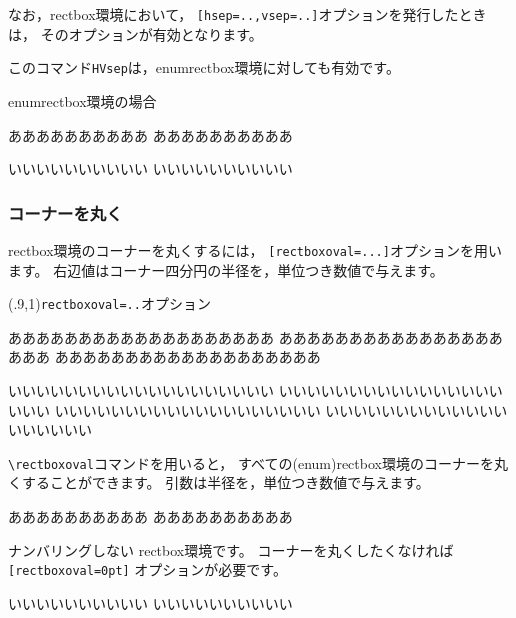 なお，\textsf{rectbox}環境において，
\verb+[hsep=..,vsep=..]+オプションを発行したときは，
そのオプションが有効となります。

このコマンド\verb+HVsep+は，\textsf{enumrectbox}環境に対しても有効です。

\begin{showEx}{\textsf{enumrectbox}環境の場合}
\begin{enumrectbox}
ああああああああああ
ああああああああああ
\end{enumrectbox}

\begin{enumrectbox}
いいいいいいいいいい
いいいいいいいいいい
\end{enumrectbox}
\end{showEx}
\newpage

\subsubsection{コーナーを丸く}
\textsf{rectbox}環境のコーナーを丸くするには，
\verb+[rectboxoval=...]+オプションを用います。
右辺値はコーナー四分円の半径を，単位つき数値で与えます。

\begin{showEx}(.9,1){\texttt{rectboxoval=..}オプション}
\begin{rectbox}[rectboxoval=10pt]
あああああああああああああああああああ
あああああああああああああああああああ
あああああああああああああああああああ

いいいいいいいいいいいいいいいいいいい
いいいいいいいいいいいいいいいいいいい
いいいいいいいいいいいいいいいいいいい
いいいいいいいいいいいいいいいいいいい
\end{rectbox}
\end{showEx}

\verb+\rectboxoval+コマンドを用いると，
すべての\textsf{(enum)rectbox}環境のコーナーを丸くすることができます。
引数は半径を，単位つき数値で与えます。

\begin{showEx}{}
\rectboxoval{6pt}
\begin{enumrectbox}
ああああああああああ
ああああああああああ
\end{enumrectbox}

\begin{rectbox}[rectboxoval=0pt]
ナンバリングしない
\textsf{rectbox}環境です。
コーナーを丸くしたくなければ
\verb+[rectboxoval=0pt]+
オプションが必要です。
\end{rectbox}

\begin{enumrectbox}
いいいいいいいいいい
いいいいいいいいいい
\end{enumrectbox}
\end{showEx}

